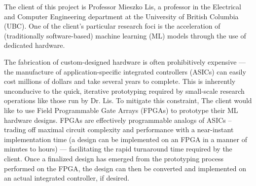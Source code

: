 The client of this project is Professor Mieszko Lis, a professor in the Electrical and Computer Engineering department at the University of British Columbia (UBC). One of the client's particular research foci is the acceleration of (traditionally software-based) machine learning (ML) models through the use of dedicated hardware.

The fabrication of custom-designed hardware is often prohibitively expensive --- the manufacture of application-specific integrated controllers (ASICs) can easily cost millions of dollars and take several years to complete. This is inherently unconducive to the quick, iterative prototyping required by small-scale research operations like those run by Dr. Lis. To mitigate this constraint, The client would like to use Field Programmable Gate Arrays (FPGAs) to prototype their ML hardware designs. FPGAs are effectively programmable analogs of ASICs -- trading off maximal circuit complexity and performance with a near-instant implementation time (a design can be implemented on an FPGA in a manner of minutes to hours) --- facilitating the rapid turnaround time required by the client. Once a finalized design has emerged from the prototyping process performed on the FPGA, the design can then be converted and implemented on an actual integrated controller, if desired.
